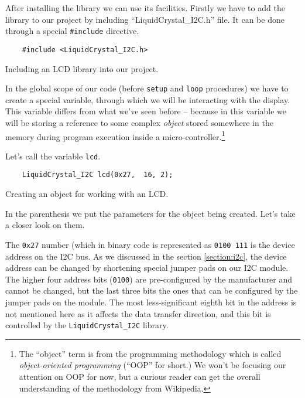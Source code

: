 \documentclass[../sparc.tex]{subfiles}
\begin{document}
After installing the library we can use its facilities.  Firstly we have to add
the library to our project by including ``LiquidCrystal\_I2C.h'' file.  It can
be done through a special \texttt{#include} directive.

\begin{listing}[ht]
  \begin{verbatim}
    #include <LiquidCrystal_I2C.h>
  \end{verbatim}
  \caption{Including an LCD library into our project.}
  \label{listing:game-dev-lcd-include}
\end{listing}

In the global scope of our code (before \texttt{setup} and
\texttt{loop} procedures) we have to create a special variable, through
which we will be interacting with the display.  This variable differs from what
we've seen before -- because in this variable we will be storing a reference to
some complex \emph{object} stored somewhere in the memory during program
execution inside a micro-controller.\footnote{The ``object'' term is from the
programming methodology which is called \emph{object-oriented programming}
(``OOP'' for short.)  We won't be focusing our attention on OOP for now, but a
curious reader can get the overall understanding of the methodology from
Wikipedia.}

Let's call the variable \texttt{lcd}.

\begin{listing}[ht]
  \begin{verbatim}
    LiquidCrystal_I2C lcd(0x27,  16, 2);
  \end{verbatim}
  \caption{Creating an object for working with an LCD.}
  \label{listing:game-dev-lcd-object}
\end{listing}

In the parenthesis we put the parameters for the object being created.  Let's
take a closer look on them.

The \texttt{0x27} number (which in binary code is represented as
\texttt{0100 111} is the device address on the \gls{I2C} bus.  As we
discussed in the section \ref{section:i2c}, the device address can be changed by
shortening special jumper pads on our I2C module.  The higher four address bits
(\texttt{0100}) are pre-configured by the manufacturer and cannot be
changed, but the last three bits the ones that can be configured by the jumper
pads on the module.  The most less-significant eighth bit in the address is not
mentioned here as it affects the data transfer direction, and this bit is
controlled by the \texttt{LiquidCrystal\_I2C} library.
\end{document}
